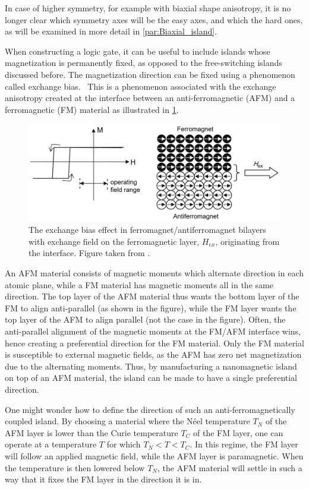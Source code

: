 \documentclass[10pt,a4paper]{article}
\begin{document}
In case of higher symmetry, for example with biaxial shape anisotropy, it is no longer clear which symmetry axes will be the easy axes, and which the hard ones, as will be examined in more detail in \cref{par:Biaxial_island}. \par
When constructing a logic gate, it can be useful to include islands whose magnetization is permanently fixed, as opposed to the free-switching islands discussed before. The magnetization direction can be fixed using a phenomenon called exchange bias.~\cite{ExchangeBias_Mechanisms,ExchangeBias_nanostructures,ExchangeBias,syllabus_PoAEaPD} This is a phenomenon associated with the exchange anisotropy created at the interface between an anti-ferromagnetic (AFM) and a ferromagnetic (FM) material as illustrated in \cref{fig:Intro_ExchangeBias}.
\begin{figure}[t]
    \centering
    \includegraphics[width=0.9\columnwidth]{Figures/Introduction/Syallabus_PoAEaPD - Figure 2.7.png}
    \caption{The exchange bias effect in ferromagnet/antiferromagnet bilayers with exchange field on the ferromagnetic layer, $H_{ex}$, originating from the interface. Figure taken from \cite{syllabus_PoAEaPD}.}
    \label{fig:Intro_ExchangeBias}
\end{figure}
An AFM material consists of magnetic moments which alternate direction in each atomic plane, while a FM material has magnetic moments all in the same direction. The top layer of the AFM material thus wants the bottom layer of the FM to align anti-parallel (as shown in the figure), while the FM layer wants the top layer of the AFM to align parallel (not the case in the figure). Often, the anti-parallel alignment of the magnetic moments at the FM/AFM interface wins, hence creating a preferential direction for the FM material. Only the FM material is susceptible to external magnetic fields, as the AFM has zero net magnetization due to the alternating moments. Thus, by manufacturing a nanomagnetic island on top of an AFM material, the island can be made to have a single preferential direction. \par
One might wonder how to define the direction of such an anti-ferromagnetically coupled island. By choosing a material where the N\'{e}el temperature $T_N$ of the AFM layer is lower than the Curie temperature $T_C$ of the FM layer, one can operate at a temperature $T$ for which $T_N < T < T_C$. In this regime, the FM layer will follow an applied magnetic field, while the AFM layer is paramagnetic. When the temperature is then lowered below $T_N$, the AFM material will settle in such a way that it fixes the FM layer in the direction it is in.~\cite{ExchangeBias_Mechanisms}
\end{document}
